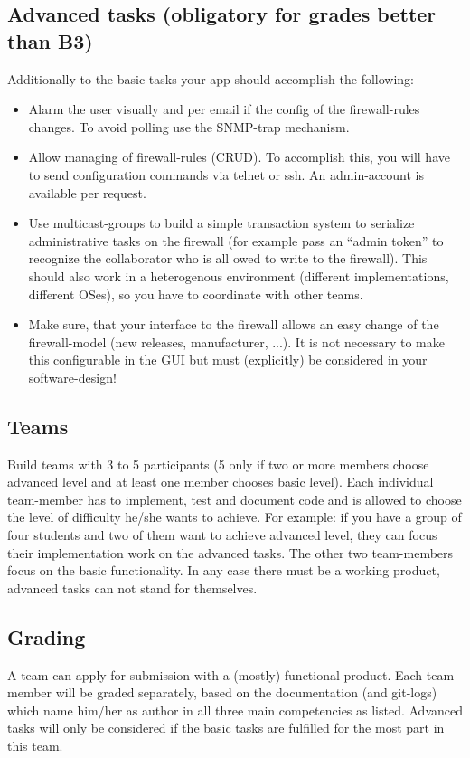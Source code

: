 \documentclass[11pt, a4paper]{article}
\begin{document}
\subsection{Advanced tasks (obligatory for grades better than B3)}
Additionally to the basic tasks your app should accomplish the following:
\begin{itemize}
\item Alarm the user visually and per email if the config of the firewall-rules changes. To avoid polling use the SNMP-trap mechanism.
\item Allow managing of firewall-rules (CRUD). To accomplish this, you will have to send configuration commands via telnet or ssh. An admin-account is available per request.
\item Use multicast-groups to build a simple transaction system to serialize administrative tasks on the firewall (for example pass an “admin token” to recognize the collaborator who is all    owed to write to the firewall). This should also work in a heterogenous environment (different implementations, different OSes), so you have to coordinate with other teams.
\item Make sure, that your interface to the firewall allows an easy change of the firewall-model (new releases, manufacturer, ...). It is not necessary to make this configurable in the GUI but must (explicitly) be considered in your software-design!
\end{itemize} 

\subsection{Teams}
Build teams with 3 to 5 participants (5 only if two or more members choose advanced level and at least one member chooses basic level). Each individual team-member has to implement, test and document code and is allowed to choose the level of difficulty he/she wants to achieve. For example: if you have a group of four students and two of them want to achieve advanced level, they can focus their implementation work on the advanced tasks. The other two team-members focus on the basic functionality. In any case there must be a working product, advanced tasks can not stand for themselves.

\subsection{Grading}
A team can apply for submission with a (mostly) functional product.
Each team-member will be graded separately, based on the documentation (and git-logs) which name him/her as author in all three main competencies as listed.
Advanced tasks will only be considered if the basic tasks are fulfilled for the most part in this team.
\end{document}
